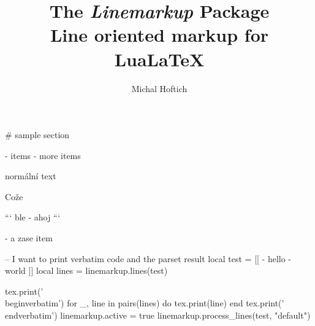 \documentclass{article}
\begin{document}
\title{The \textit{Linemarkup} Package\\Line oriented markup for LuaLaTeX}
\author{Michal Hoftich}

\maketitle





# sample section

- items 
- more items

\bgroup
\noindent normální text
\egroup

Cože

```
ble
- ahoj
```

- a zase item

\LinemarkupDisable

\begin{luacode*}
  -- I want to print verbatim code and the parset result
local test = [[
- hello
- world
]]
local lines = linemarkup.lines(test)

tex.print('\\begin{verbatim}')
for _, line in pairs(lines) do
  tex.print(line)
end
tex.print('\\end{verbatim}')
linemarkup.active = true
linemarkup.process_lines(test, "default")
\end{luacode*}
\LinemarkupEnable




\end{document}
